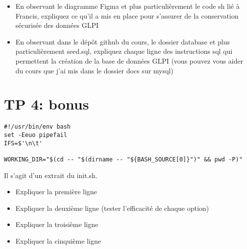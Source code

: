 \documentclass[12pt, letterpaper]{article}
\begin{document}
\begin{itemize}
    \item En observant le diagramme Figma et plus particulièrement le code sh lié à Francis, expliquez ce qu'il a mis en place pour s'assurer de la conservation sécurisée des données GLPI 
    \item En observant dans le dépôt github du cours, le dossier database et plus particulièrement seed.sql, expliquez chaque ligne des instructions sql qui permettent la création de la base de données GLPI (vous pouvez vous aider du cours que j'ai mis dans le dossier docs sur mysql)
\end{itemize}


\section{TP 4: bonus }

\begin{verbatim}
#!/usr/bin/env bash
set -Eeuo pipefail
IFS=$'\n\t'

WORKING_DIR="$(cd -- "$(dirname -- "${BASH_SOURCE[0]}")" && pwd -P)"  
\end{verbatim}

\begin{tcolorbox}
    Il s'agit d'un extrait du init.sh. 
\end{tcolorbox}

\begin{itemize}
    \item Expliquer la première ligne
    \item Expliquer la deuxième ligne (tester l'efficacité de chaque option)
    \item Expliquer la troisième ligne 
    \item Expliquer la cinquième ligne
\end{itemize}
\end{document}
